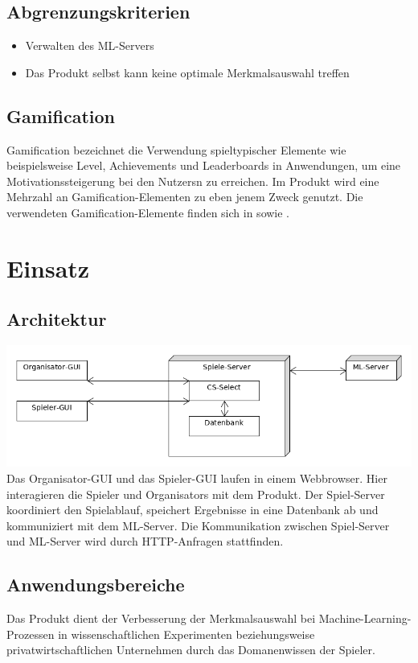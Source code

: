 \documentclass[a4paper]{scrreprt}
\begin{document}
    \section{Abgrenzungskriterien}
    \begin{itemize}
        \item Verwalten des \Gls{ML-Server}s
	    \item Das \Gls{Produkt} selbst kann keine optimale Merkmalsauswahl treffen
    \end{itemize}

    \section{Gamification}
    \label{sec:gamification}
    Gamification bezeichnet die Verwendung spieltypischer Elemente wie beispielsweise Level, \Glspl{Achievement} und Leaderboards in Anwendungen, um eine Motivationssteigerung bei den \Glspl{Nutzer}n zu erreichen.
    Im \Gls{Produkt} wird eine Mehrzahl an Gamification-Elementen zu eben jenem Zweck genutzt.
    Die verwendeten Gamification-Elemente finden sich in  sowie .

    
    \chapter{Einsatz}

    \section{Architektur}
    \includegraphics[width=\textwidth]{uml/export/Architektur.png}
    Das \Gls{Organisator}-GUI und das \Gls{Spieler}-GUI laufen in einem \Gls{Webbrowser}.
    Hier interagieren die \Gls{Spieler} und \Glspl{Organisator} mit dem \Gls{Produkt}.
    Der \Gls{Spiel-Server} koordiniert den Spielablauf, speichert Ergebnisse
    in eine Datenbank ab und kommuniziert mit dem \Gls{ML-Server}.
    Die Kommunikation zwischen \Gls{Spiel-Server} und \Gls{ML-Server} wird durch HTTP-Anfragen stattfinden.
    \section{Anwendungsbereiche}
    Das \Gls{Produkt} dient der Verbesserung der Merkmalsauswahl bei Machine-Learning-Prozessen in wissenschaftlichen
    Experimenten beziehungsweise privatwirtschaftlichen Unternehmen durch das \Gls{Domanenwissen} der \Gls{Spieler}.
\end{document}
